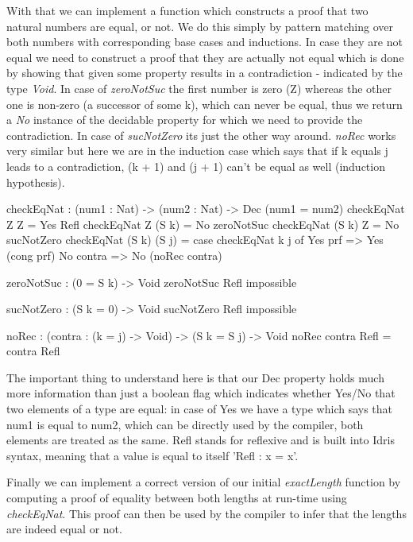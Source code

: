 With that we can implement a function which constructs a proof that two natural numbers are equal, or not. We do this simply by pattern matching over both numbers with corresponding base cases and inductions. In case they are not equal we need to construct a proof that they are actually not equal which is done by showing that given some property results in a contradiction - indicated by the type \textit{Void}. In case of \textit{zeroNotSuc} the first number is zero (Z) whereas the other one is non-zero (a successor of some k), which can never be equal, thus we return a \textit{No} instance of the decidable property for which we need to provide the contradiction. In case of \textit{sucNotZero} its just the other way around. \textit{noRec} works very similar but here we are in the induction case which says that if k equals j leads to a contradiction, (k + 1) and (j + 1) can't be equal as well (induction hypothesis).

\begin{HaskellCode}
checkEqNat : (num1 : Nat) -> (num2 : Nat) -> Dec (num1 = num2)
checkEqNat Z Z         = Yes Refl
checkEqNat Z (S k)     = No zeroNotSuc
checkEqNat (S k) Z     = No sucNotZero
checkEqNat (S k) (S j) = case checkEqNat k j of
                              Yes prf   => Yes (cong prf)
                              No contra => No (noRec contra)
                              
zeroNotSuc : (0 = S k) -> Void
zeroNotSuc Refl impossible

sucNotZero : (S k = 0) -> Void
sucNotZero Refl impossible

noRec : (contra : (k = j) -> Void) -> (S k = S j) -> Void
noRec contra Refl = contra Refl
\end{HaskellCode}  
                            

The important thing to understand here is that our Dec property holds much more information than just a boolean flag which indicates whether Yes/No that two elements of a type are equal: in case of Yes we have a type which says that num1 is equal to num2, which can be directly used by the compiler, both elements are treated as the same. Refl stands for reflexive and is built into Idris syntax, meaning that a value is equal to itself 'Refl : x = x'. %

Finally we can implement a correct version of our initial \textit{exactLength} function by computing a proof of equality between both lengths at run-time using \textit{checkEqNat}. This proof can then be used by the compiler to infer that the lengths are indeed equal or not.

